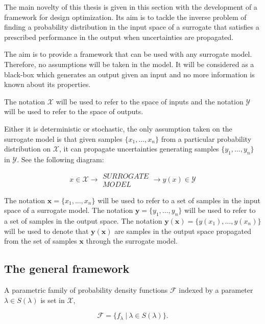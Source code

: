 The main novelty of this thesis is given in this section with the development of a framework for design optimization. 
Its aim is to tackle the inverse problem of finding a probability distribution in the input space of a surrogate that satisfies a prescribed performance in the output when uncertainties are propagated.


The aim is to provide a framework that can be used with any surrogate model. 
Therefore, no assumptions will be taken in the model. 
It will be considered as a black-box which generates an output given an input and no more information is known about its properties.

The notation $\mathcal{X}$ will be used to refer to the space of inputs and the notation $\mathcal{Y}$ will be used to refer to the space of outputs.

Either it is deterministic or stochastic, the only assumption taken on the surrogate model is that given samples $\{x_1, \dots, x_n\}$ from a particular probability distribution on $\mathcal{X}$, it can propagate uncertainties generating samples $\{y_1, \dots, y_n\}$ in $\mathcal{Y}$. See the following diagram:

$$
x \in \mathcal{X} \rightarrow \boxed{ \substack{SURROGATE \\ MODEL} } \rightarrow y(x) \in \mathcal{Y}
$$

The notation $\pmb{x} = \{x_1, \dots, x_n\}$ will be used to refer to a set of samples in the input space of a surrogate model.
The notation $\pmb{y} = \{y_1, \dots, y_n\}$ will be used to refer to a set of samples in the output space.
The notation $\pmb{y}(\pmb{x}) = \{y(x_1), \dots, y(x_n)\}$ will be used to denote that $\pmb{y}(\pmb{x})$ are samples in the output space propagated from the set of samples $\pmb{x}$ through the surrogate model.

\subsection{The general framework}

A parametric family of probability density functions $\mathcal{F}$ indexed by a parameter $\lambda \in S(\lambda)$ is set in $\mathcal{X}$,

$$
  \mathcal{F} = \{f_{\lambda} \ | \ \lambda \in S(\lambda)\}.
$$

